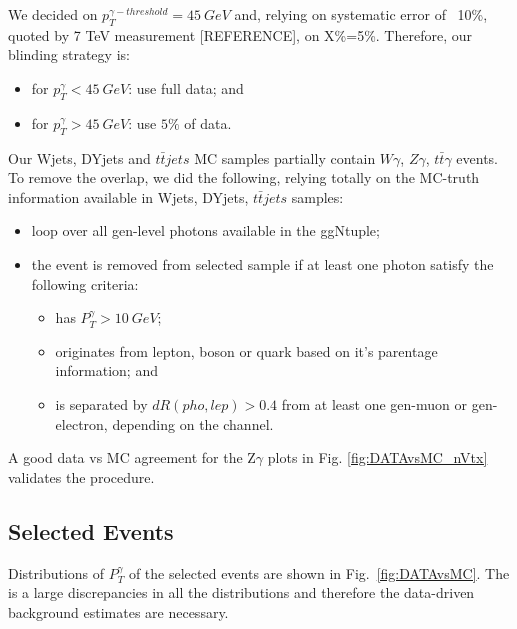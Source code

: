 We decided on $p_T^{\gamma-threshold}=45~GeV$ and, relying on systematic error of ~10\%, quoted by 7 TeV measurement [REFERENCE], on X\%=5\%. Therefore, our blinding strategy is:
\begin{itemize}
  \item for $p_T^{\gamma}<45~GeV$: use full data; and
  \item for $p_T^{\gamma}>45~GeV$: use $5\%$ of data.
\end{itemize}

Our Wjets, DYjets and $t\bar{t}jets$ MC samples partially contain $W\gamma$, $Z\gamma$, $t\bar{t}\gamma$ events. To remove the overlap, we did the following, relying totally on the MC-truth information available in Wjets, DYjets, $t\bar{t}jets$ samples:
\begin{itemize}
  \item loop over all gen-level photons available in the ggNtuple;
  \item the event is removed from selected sample if at least one photon satisfy the following criteria:
  \begin{itemize}
     \item has $P_T^{\gamma}>10~GeV$;
     \item originates from lepton, boson or quark based on it's parentage information; and
     \item is separated by $dR(pho,lep)>0.4$ from at least one gen-muon or gen-electron, depending on the channel.
  \end{itemize}
\end{itemize}

A good data vs MC agreement for the Z$\gamma$ plots in Fig. \ref{fig:DATAvsMC_nVtx} validates the procedure.

\subsection{Selected Events}


Distributions of $P_T^{\gamma}$ of the selected events are shown in Fig.~\ref{fig:DATAvsMC}. The is a large discrepancies in all the distributions and therefore the data-driven background estimates are necessary.

